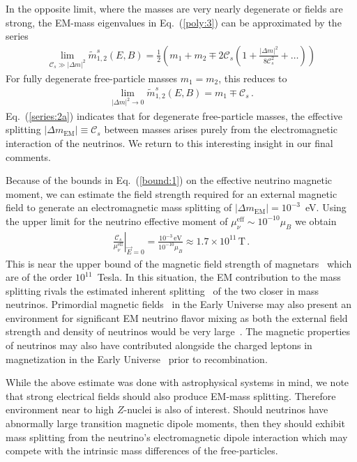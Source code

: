 \documentclass{ws-ijmpa}
\newcommand{\req}[1]{Eq.~(\ref{#1})}
\begin{document}
In the opposite limit, where the masses are very nearly degenerate or fields are strong, the EM-mass eigenvalues in \req{poly:3} can be approximated by the series
\begin{align}
\label{series:2}
\lim_{\mathcal{C}_{s}\gg|\Delta m|^{2}}\widetilde m_{1,2}^{s}(E,B)=\frac{1}{2}\left(m_{1}+m_{2}\mp2\mathcal{C}_{s}\left(1+\frac{|\Delta m|^{2}}{8\mathcal{C}_{s}^{2}}+\ldots\right)\right)
\end{align}
For fully degenerate free-particle masses $m_{1}=m_{2}$, this reduces to
\begin{align}
\label{series:2a}
\lim_{|\Delta m|^{2}\to0}\widetilde m_{1,2}^{s}(E,B)=m_{1}\mp\mathcal{C}_{s}\,.
\end{align}
\req{series:2a} indicates that for degenerate free-particle masses, the effective splitting $|\Delta m_\mathrm{EM}|\equiv\mathcal{C}_{s}$ between masses arises purely from the electromagnetic interaction of the neutrinos. We return to this interesting insight in our final comments.

Because of the bounds in \req{bound:1} on the effective neutrino magnetic moment, we can estimate the field strength required for an external magnetic field to generate an electromagnetic mass splitting of $|\Delta m_\mathrm{EM}|=10^{-3}$~eV. Using the upper limit for the neutrino effective moment of $\mu_{\nu}^\mathrm{eff}\sim10^{-10}\mu_{B}$ we obtain
\begin{align}
\label{estimate:1}
\left.\frac{\mathcal{C}_{s}}{\mu_{\nu}^\mathrm{eff}}\right\rvert_{\vec{E}=0}=\frac{10^{-3}\,\mathrm{eV}}{10^{-10}\mu_{B}}\approx1.7\times10^{11}\,\mathrm{T}\,.
\end{align}
This is near the upper bound of the magnetic field strength of magnetars~\cite{Kaspi:2017fwg} which are of the order $10^{11}$~Tesla. In this situation, the EM contribution to the mass splitting rivals the estimated inherent splitting~\cite{ParticleDataGroup:2022pth} of the two closer in mass neutrinos. Primordial magnetic fields~\cite{Grasso:2000wj} in the Early Universe may also present an environment for significant EM neutrino flavor mixing as both the external field strength and density of neutrinos would be very large~\cite{Rafelski:2023emw}. The magnetic properties of neutrinos may also have contributed alongside the charged leptons in magnetization in the Early Universe~\cite{Steinmetz:2023nsc} prior to recombination. 

While the above estimate was done with astrophysical systems in mind, we note that strong electrical fields should also produce EM-mass splitting. Therefore environment near to high $Z$-nuclei is also of interest. Should neutrinos have abnormally large transition magnetic dipole moments, then they should exhibit mass splitting from the neutrino's electromagnetic dipole interaction which may compete with the intrinsic mass differences of the free-particles.
\end{document}
